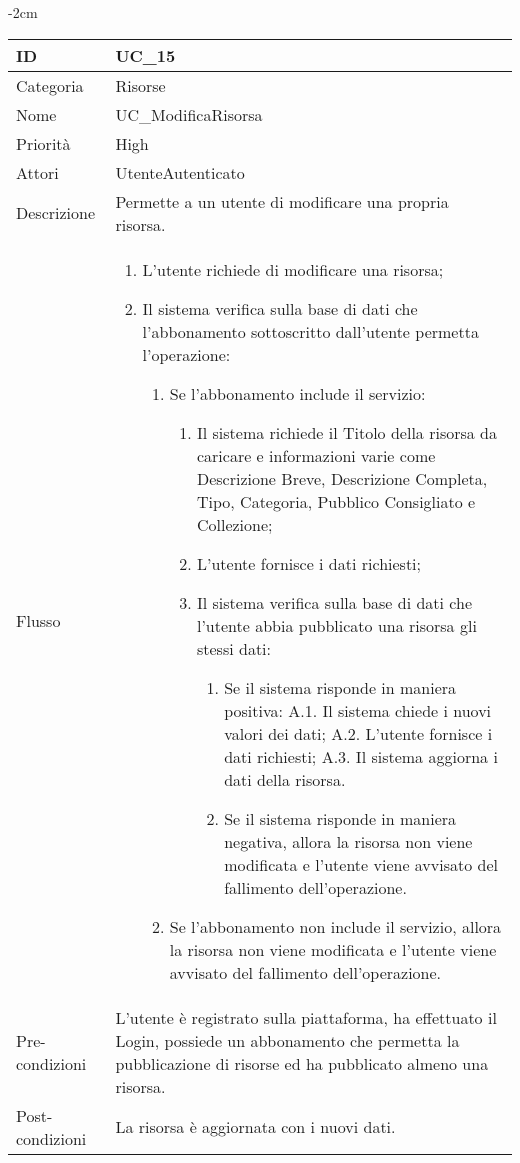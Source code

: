 \begin{center}
\begin{table}[bp]
    \centering
    \addtolength{\leftskip} {-2cm}
\begin{tabular}{ |p{2.6cm}|p{13cm}|  }
\hline
ID & UC\_15 \\\hline
Categoria & Risorse\\\hline
Nome & UC\_ModificaRisorsa\\\hline
Priorità & High \\\hline
Attori &  UtenteAutenticato \\\hline
Descrizione & Permette a un utente di modificare una propria risorsa.\\\hline
Flusso &  	\begin{enumerate}
			\item L'utente richiede di modificare una risorsa;
			\item Il sistema verifica sulla base di dati che l'abbonamento sottoscritto dall'utente permetta l'operazione:
			\begin{enumerate}
				\item Se l'abbonamento include il servizio:
				\begin{enumerate}
					\item Il sistema richiede il Titolo della risorsa da caricare e informazioni varie come Descrizione Breve,  Descrizione Completa, Tipo, Categoria, Pubblico Consigliato e Collezione;
					\item L'utente fornisce i dati richiesti;
					\item Il sistema verifica sulla base di dati che l'utente abbia pubblicato una risorsa gli stessi dati:
					\begin{enumerate}
						\item Se il sistema risponde in maniera positiva:
							\subitem A.1. Il sistema chiede i nuovi valori dei dati;
							\subitem A.2. L'utente fornisce i dati richiesti;
							\subitem A.3. Il sistema aggiorna i dati della risorsa.
						\item Se il sistema risponde in maniera negativa, allora  la risorsa non viene modificata e l'utente viene avvisato del fallimento dell'operazione.
					\end{enumerate}
				\end{enumerate}
				\item Se l'abbonamento non include il servizio, allora la risorsa non viene modificata e l'utente viene avvisato del fallimento dell'operazione.
			\end{enumerate}
		\end{enumerate}\\\hline
Pre-condizioni & L'utente è registrato sulla piattaforma, ha effettuato il Login, possiede un abbonamento che permetta la pubblicazione di risorse ed ha pubblicato almeno una risorsa.\\\hline
Post-condizioni & La risorsa è aggiornata con i nuovi dati.\\\hline
\end{tabular}
\label{table_use_case:15}\newline
\end{table}


\end{center}